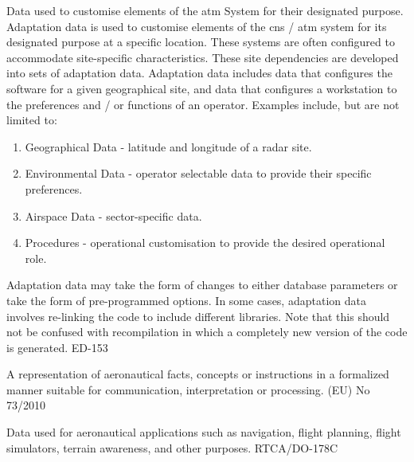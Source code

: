 
%
	{Data used to customise elements of the \gls{atm} System for their designated purpose.
		Adaptation data is used to customise elements of the \gls{cns} / \gls{atm} system for its designated purpose at a specific location.
		These systems are often configured to accommodate site-specific characteristics.
		These site dependencies are developed into sets of adaptation data.
		Adaptation data includes data that configures the software for a given geographical site, and data that configures a workstation to the preferences and / or functions of an operator.
		Examples include, but are not limited to:
		\begin{enumerate}
			\item Geographical Data - latitude and longitude of a radar site.
			\item Environmental Data - operator selectable data to provide their specific preferences.
			\item Airspace Data - sector-specific data.
			\item Procedures - operational customisation to provide the desired operational role.
		\end{enumerate}
		Adaptation data may take the form of changes to either database parameters or take the form of pre-programmed options.
		In some cases, adaptation data involves re-linking the code to include different libraries.
		Note that this should not be confused with recompilation in which a completely new version of the code is generated. ED-153 \cite{citation:ED153}}

%
	{A representation of aeronautical facts, concepts or instructions in a formalized manner suitable for communication, interpretation or processing. (EU) No 73/2010 \cite{citation:EU732010}

	Data used for aeronautical applications such as navigation, flight planning, flight simulators, terrain awareness, and other purposes. RTCA/DO-178C \cite{citation:ED12C}}

